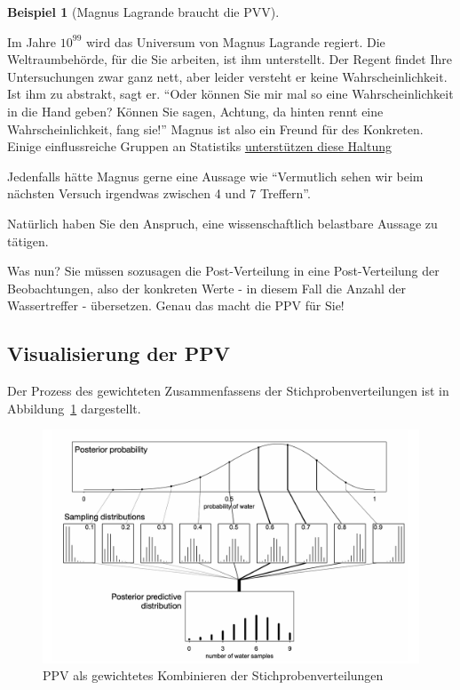 \documentclass[
  a4paper,
  DIV=11]{scrreprt}
\theoremstyle{definition}
\newtheorem{example}{Beispiel}[chapter]
\theoremstyle{remark}
\begin{document}
\leavevmode{}%
\begin{example}[Magnus Lagrande braucht die PVV]\label{exm-wozu-ppv}

Im Jahre \(10^{99}\) wird das Universum von Magnus Lagrande regiert. Die
Weltraumbehörde, für die Sie arbeiten, ist ihm unterstellt. Der Regent
findet Ihre Untersuchungen zwar ganz nett, aber leider versteht er keine
Wahrscheinlichkeit. Ist ihm zu abstrakt, sagt er. ``Oder können Sie mir
mal so eine Wahrscheinlichkeit in die Hand geben? Können Sie sagen,
Achtung, da hinten rennt eine Wahrscheinlichkeit, fang sie!'' Magnus ist
also ein Freund für des Konkreten. Einige einflussreiche Gruppen an
Statistiks
\href{https://www.routledge.com/Predictive-Inference/Geisser/p/book/9780367449919}{unterstützen
diese Haltung}

Jedenfalls hätte Magnus gerne eine Aussage wie ``Vermutlich sehen wir
beim nächsten Versuch irgendwas zwischen 4 und 7 Treffern''.

Natürlich haben Sie den Anspruch, eine wissenschaftlich belastbare
Aussage zu tätigen.

Was nun? Sie müssen sozusagen die Post-Verteilung in eine
Post-Verteilung der Beobachtungen, also der konkreten Werte - in diesem
Fall die Anzahl der Wassertreffer - übersetzen. Genau das macht die PPV
für Sie!

\end{example}

\hypertarget{visualisierung-der-ppv}{%
\subsection{Visualisierung der PPV}\label{visualisierung-der-ppv}}

Der Prozess des gewichteten Zusammenfassens der Stichprobenverteilungen
ist in Abbildung~\ref{fig-ppv} dargestellt.

\begin{figure}

{\centering \includegraphics{./img/ppv.png}

}

\caption{\label{fig-ppv}PPV als gewichtetes Kombinieren der
Stichprobenverteilungen}

\end{figure}
\end{document}
